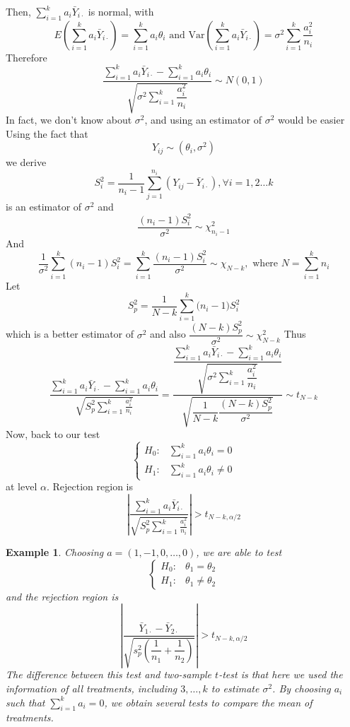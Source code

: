 \documentclass[11pt]{article}
\newtheorem{ex}{Example}[section]
\begin{document}
Then, $\sum_{i = 1}^{k} a_i \bar{Y}_{i\cdot} $ is normal, with 
$$E\left(\sum_{i = 1}^{k}a_i \bar{Y}_{i\cdot}\right) = \sum_{i = 1}^k a_i \theta_i  \text{ and } \text{Var}\left(\sum_{i = 1}^{k} a_i \bar{Y}_{i\cdot}\right) = \sigma^2 \sum_{ i = 1}^k \dfrac{a_i^2}{n_i}$$
Therefore
$$\dfrac{\sum_{i = 1}^{k} a_i \bar{Y}_{i\cdot} -  \sum_{i = 1}^k a_i \theta_i }{\sqrt{\sigma^2 \sum_{ i = 1}^k \dfrac{a_i^2}{n_i}}} \sim N(0, 1) $$
	In fact, we don't know about $\sigma^2$, and using an estimator of $\sigma^2$ would be easier
Using the fact that 
$$ Y_{ij} \sim (\theta_i, \sigma^2)$$
 we derive
	$$S_i^2 = \dfrac{1}{n_i - 1} \sum_{j = 1}^{n_i} \left(Y_{ij} - \bar{Y}_{i \cdot}\right), \forall i = 1, 2 \dots k  $$
is an estimator of $\sigma^2$ and 
$$\dfrac{(n_i - 1)S_i^2}{\sigma^2} \sim \chi^2_{n_i - 1} $$
And 
$$\dfrac{1}{\sigma^2} \sum_{ i = 1}^k (n_i - 1)S_i^2 =\sum_{ i = 1}^k \dfrac{(n_i - 1)S_i^2}{\sigma^2}  \sim 
\chi_{N - k}, \text{ where } N = \sum_{i = 1}^k n_i$$
Let  $$S_p^2 = \dfrac{1}{N- k} \sum_{i = 1}^k \big(n_i - 1\big)S_i^2 $$
which is a better estimator of $\sigma^2$ and also $\dfrac{(N- k) S_p^2}{\sigma^2} \sim \chi_{N - k}^2$ 
Thus
 $$\dfrac{\sum_{ i = 1}^k a_i \bar{Y}_{i \cdot} - \sum_{i = 1}^k a_i \theta_i}{\sqrt{S_p^2 \sum_{ i = 1}^k \frac{a_i^2}{n_i}}} = \dfrac{\dfrac{\sum_{i = 1}^{k} a_i \bar{Y}_{i\cdot} -  \sum_{i = 1}^k a_i \theta_i }{\sqrt{\sigma^2 \sum_{ i = 1}^k \dfrac{a_i^2}{n_i}}}}{\sqrt{\dfrac{1}{N - k} \dfrac{(N- k) S_p^2}{\sigma^2}}}   \sim t_{N- k}$$
Now, back to our test 
$$ \begin{cases}
	H_0: & \sum_{i = 1}^k a_i \theta_i = 0 \\
	H_1: & \sum_{i = 1}^k a_i \theta_i \neq 0 
\end{cases} $$ at level $\alpha$. 
Rejection region is $$\left| \dfrac{\sum_{i = 1}^k a_i \bar{Y}_{i \cdot}}{\sqrt{S_p^2 \sum_{i = 1}^k \frac{a_i^2}{n_i}}} \right| > t_{N-k, \alpha/2} $$
\begin{ex}
	Choosing $a = (1, - 1, 0 , \dots, 0)$, we are able to test $$\begin{cases}
		H_0:& \theta_1 = \theta_2 \\H_1: & \theta_1 \neq \theta_2
	\end{cases} $$ and the rejection region is 
$$\left|\dfrac{\bar{Y}_{1\cdot} - \bar{Y}_{2 \cdot}}{\sqrt{s_p^2 \left(\dfrac{1}{n_1} + \dfrac{1}{n_2} \right)}} \right| > t_{N - k, \alpha/ 2} $$ The difference between this test and two-sample $t$-test is  that here we used the information of all treatments, including $3, \dots, k$ to estimate $\sigma^2$. By choosing $a_i$ such that $\sum_{ i = 1}^k a_i = 0$, we obtain several tests to compare the mean of treatments. 
\end{ex}
\end{document}
